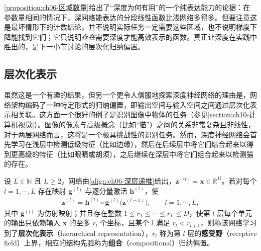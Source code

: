 \documentclass[../../main.tex]{subfiles}
\begin{document}
\begin{remark}\cref{proposition:ch06-区域数量}给出了“深度为何有用”的一个纯表达能力的论据：在参数量相同的情况下，深网络能表达的分段线性函数比浅网络多得多。但要注意这是最坏情形下的计数结论，并不说明实际任务一定需要这些区域，也不说明梯度下降能找到它们；它只说明\emph{存在}需要深度才能高效表示的函数。真正让深度在实践中胜出的，是下一小节讨论的层次化归纳偏置。
\end{remark}

\subsection{层次化表示}\label{subsection:ch06-层次化表示}

虽然这是一个有趣的结果，但另一个更令人信服地探索深度神经网络的理由是，网络架构编码了一种特定形式的归纳偏置，即输出空间与输入空间之间通过层次化表示相关联。这方面一个很好的例子是识别图像中物体的任务（参见\cref{section:ch10-计算机视觉}）。图像的像素与高级概念（比如“猫”）之间的关系非常复杂且非线性，对于两层网络而言，这将是一个极具挑战性的识别任务。然而，深度神经网络会首先学习在浅层中检测低级特征（比如边缘），然后在后续层中将它们结合起来以得到更高级的特征（比如眼睛或胡须），之后继续在深层中将它们组合起来以检测猫的存在。

\begin{definition}[层次化表示]\label{definition:ch06-层次化表示}
设 $L\in\mathbb{N}$ 且 $L\geqslant2$，网络由\eqref{align:ch06-深层递推}给出，$\boldsymbol{z}^{(0)}=\boldsymbol{x}\in\mathbb{R}^{D}$。若对每个 $l=1,\cdots,L$ 存在映射 $\boldsymbol{g}^{(l)}$ 与逐分量激活 $\boldsymbol{h}^{(l)}$，使
\begin{align}
\boldsymbol{z}^{(l)}=\boldsymbol{h}^{(l)}\circ\boldsymbol{g}^{(l)}\bigl(\boldsymbol{z}^{(l-1)}\bigr),\qquad l=1,\cdots,L,
\label{align:ch06-层次化表示}
\end{align}
其中 $\boldsymbol{g}^{(l)}$ 为仿射映射；并且存在整数 $1\leqslant r_{1}\leqslant\cdots\leqslant r_{L}\leqslant D$，使第 $l$ 层每个单元的输出只依赖输入 $\boldsymbol{x}$ 的至多 $r_{l}$ 个坐标，且某个 $l$ 满足 $r_{l}<r_{l+1}$，则称该网络学习到了\textbf{层次化表示}（hierarchical representation），$r_{l}$ 称为第 $l$ 层的\textbf{感受野}（receptive field）上界，相应的结构先验称为\textbf{组合}（compositional）归纳偏置。
\end{definition}
\end{document}
